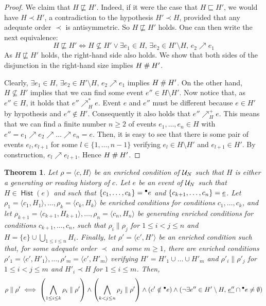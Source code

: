 \documentclass[12pt,a4paper]{article}
\newtheorem{theorem}{Theorem}
\newcommand{\hist}[1]{\ensuremath{\mathop{\mathsf{Hist}}{(#1)}}}
\newcommand{\confl}{\ensuremath\mathbin\#}
\newcommand{\evolves}{\ensuremath{\sqsubseteq}}
\begin{document}
\begin{proof}
We claim that $H \not\sqsubseteq H'$.  Indeed, if it were the case that $H
\evolves H'$, we would have $H \prec H'$, a contradiction to the hypothesis $H'
\prec H$, provided that any adequate order $\prec$ is antisymmetric.  So $H
\not\sqsubseteq H'$ holds.  One can then write the next equivalence: $$H
\not\sqsubseteq H' \iff H \not\subseteq H' \lor \exists e_1 \in H,\, \exists
e_2 \in H' \setminus H,\, e_2 \nearrow e_1$$  As $H \not\sqsubseteq H'$ holds,
the right-hand side also holds.  We show that both sides of the disjunction in
the right-hand size implies $H \confl H'$.

Clearly, $\exists e_1 \in H,\, \exists e_2 \in H' \setminus H,\, e_2 \nearrow
e_1$ implies $H \confl H'$.  On the other hand, $H \not\subseteq H'$ implies
that we can find some event $e'' \in H \setminus H'$.  Now notice that, as $e''
\in H$, it holds that $e'' \nearrow^*_H e$.  Event $e$ and $e''$ must be
different because $e \in H'$ by hypothesis and $e'' \notin H'$.  Consequently
it also holds that $e'' \nearrow^+_H e$.  This means that we can find a finite
number $n \ge 2$ of events $e_1, \ldots, e_n \in H$ with $e'' = e_1 \nearrow
e_2 \nearrow \ldots \nearrow e_n = e$.  Then, it is easy to see that there is
some pair of events $e_l, e_{l+1}$ for some $l \in \{1, \ldots, n - 1\}$
verifying $e_l \in H \setminus H'$ and $e_{l+1} \in H'$.  By construction, $e_l
\nearrow e_{l+1}$.  Hence $H \confl H'$.
\end{proof}

\begin{theorem}
Let $\rho = \langle c, H \rangle$ be an enriched condition of $\mathcal{U}_{N}$ such
that $H$ is either a generating or reading history of $c$.  Let $e$ be an event
of $\mathcal{U}_{N}$ such that $H \in \hist{e}$ and such that $\{c_1, \ldots, c_k\} =
{}^\bullet e$ and $\{c_{k+1}, \ldots, c_n\} = \underline{e}$.  Let $\rho_1 = \langle c_1,
H_1 \rangle, \ldots, \rho_k = \langle c_k, H_k \rangle$ be enriched conditions
for conditions $c_1, \ldots, c_k$, and let $\rho_{k+1} = \langle c_{k+1},
H_{k+1} \rangle, \ldots, \rho_n = \langle c_n, H_n \rangle$ be generating
enriched conditions for conditions $c_{k+1}, \ldots, c_n$, such that $\rho_i
\parallel \rho_j$ for $1 \le i < j \le n$ and $H = \{e\} \cup \bigcup_{1 \le i
\le n} H_i$.  Finally, let $\rho' = \langle c', H' \rangle$ be an enriched
condition such that, for some adequate order $\prec$ and some $m \ge 1$, there
are enriched conditions $\rho'_1 = \langle c', H'_1 \rangle, \ldots, \rho'_m =
\langle c', H'_m \rangle$ verifying $H' = H'_1 \cup \ldots \cup H'_m$ and
$\rho'_i \parallel \rho'_j$ for $1 \le i < j \le m$ and $H'_i \prec H$ for $1
\le i \le m$.  Then, $$\rho \parallel \rho' \iff
\left ( \bigwedge_{1 \le i \le k} \rho_i \parallel \rho' \right ) \land 
\left ( \bigwedge_{k < j \le n} \rho_j \parallel \rho' \right ) \land 
\left ( c' \notin {}^\bullet e \right ) \land
\left ( \lnot \exists e'' \in H' \setminus H,\, \underline{e''} \cap {}^\bullet e \ne
\emptyset \right )$$
\end{theorem}
\end{document}
